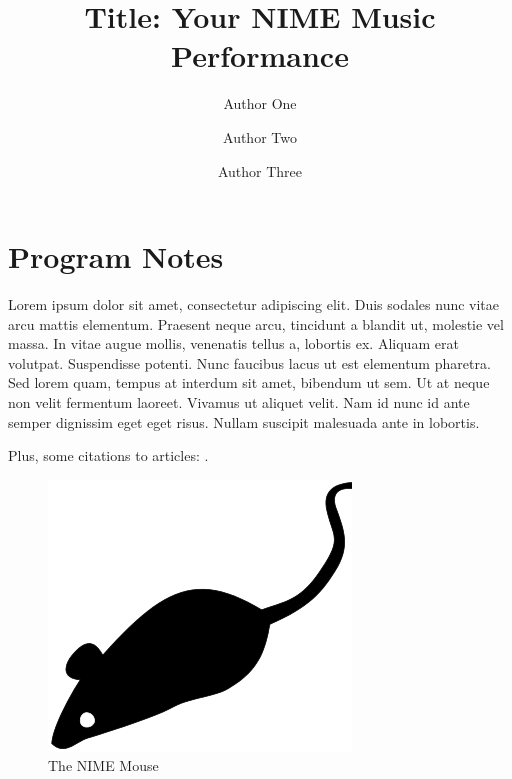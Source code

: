 \documentclass{nimemusic}
\begin{document}
\title{Title: Your NIME Music Performance}

\author{Author One}

\author{Author Two}

\author{Author Three}



\maketitle

\section{Program Notes}

Lorem ipsum dolor sit amet, consectetur adipiscing elit. Duis sodales nunc vitae arcu mattis elementum. Praesent neque arcu, tincidunt a blandit ut, molestie vel massa. In vitae augue mollis, venenatis tellus a, lobortis ex. Aliquam erat volutpat. Suspendisse potenti. Nunc faucibus lacus ut est elementum pharetra. Sed lorem quam, tempus at interdum sit amet, bibendum ut sem. Ut at neque non velit fermentum laoreet. Vivamus ut aliquet velit. Nam id nunc id ante semper dignissim eget eget risus. Nullam suscipit malesuada ante in lobortis.

Plus, some citations to articles: \cite{doe2023,
wizard2022, alien2024}.

\begin{figure}[hbt]
  \includegraphics{NIME_Mouse}
  \caption{The NIME Mouse}
\end{figure}
\end{document}
